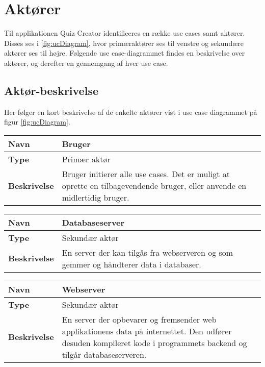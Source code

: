 \section{Aktører}

Til applikationen Quiz Creator identificeres en række use cases samt aktører. Disses ses i \ref{fig:ucDiagram}, hvor primæraktører ses til venstre og sekundære aktører ses til højre. Følgende use case-diagrammet findes en beskrivelse over aktører, og derefter en gennemgang af hver use case. 




\subsection{Aktør-beskrivelse}
Her følger en kort beskrivelse af de enkelte aktører vist i use case diagrammet på figur \ref{fig:ucDiagram}.

\begin{tabular}{|p{2cm}|p{12cm}|}

\hline 
\textbf{Navn} & Bruger \\ 
\hline 
\textbf{Type} & Primær aktør \\ 
\hline 
\textbf{Beskrivelse} & Bruger initierer alle use cases. Det er muligt at oprette en tilbagevendende bruger, eller anvende en midlertidig bruger.\\ 
\hline 

\end{tabular} 

\begin{tabular}{|p{2cm}|p{12cm}|}

\hline 
\textbf{Navn} & Databaseserver \\ 
\hline 
\textbf{Type} & Sekundær aktør \\ 
\hline 
\textbf{Beskrivelse} & En server der kan tilgås fra webserveren og som gemmer og håndterer data i databaser.\\ 
\hline 

\end{tabular} 

\begin{tabular}{|p{2cm}|p{12cm}|}

\hline 
\textbf{Navn} & Webserver \\ 
\hline 
\textbf{Type} & Sekundær aktør \\ 
\hline 
\textbf{Beskrivelse} & En server der opbevarer og fremsender web applikationens data på internettet. Den udfører desuden kompileret kode i programmets backend og tilgår databaseserveren. \\ 
\hline 

\end{tabular} 